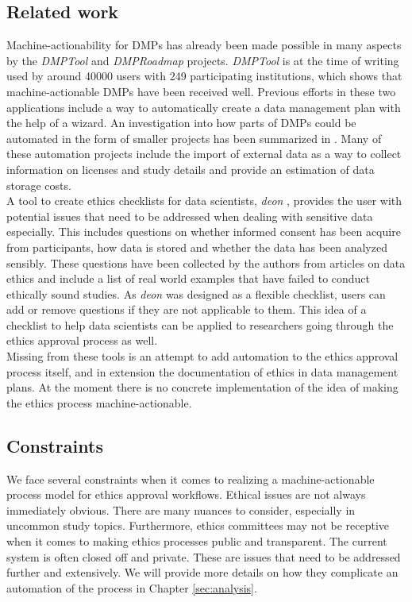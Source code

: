 \documentclass[10pt]{article}
\begin{document}
\subsection{Related work}
Machine-actionability for DMPs has already been made possible in many aspects by the \textit{DMPTool} \cite{dmptool} and \textit{DMPRoadmap} \cite{dmprmap} projects. \textit{DMPTool} is at the time of writing used by around 40000 users with 249 participating institutions, which shows that machine-actionable DMPs have been received well. Previous efforts in these two applications include a way to automatically create a data management plan with the help of a wizard. An investigation into how parts of DMPs could be automated in the form of smaller projects has been summarized in \cite{dmpblog}. Many of these automation projects include the import of external data as a way to collect information on licenses and study details and provide an estimation of data storage costs. \\

A tool to create ethics checklists for data scientists, \textit{deon} \cite{deon}, provides the user with potential issues that need to be addressed when dealing with sensitive data especially. This includes questions on whether informed consent has been acquire from participants, how data is stored and whether the data has been analyzed sensibly. These questions have been collected by the authors from articles on data ethics and include a list of real world examples that have failed to conduct ethically sound studies. As \textit{deon} was designed as a flexible checklist, users can add or remove questions if they are not applicable to them. This idea of a checklist to help data scientists can be applied to researchers going through the ethics approval process as well. \\

Missing from these tools is an attempt to add automation to the ethics approval process itself, and in extension the documentation of ethics in data management plans. At the moment there is no concrete implementation of the idea of making the ethics process machine-actionable.

\subsection{Constraints}
We face several constraints when it comes to realizing a machine-actionable process model for ethics approval workflows. Ethical issues are not always immediately obvious. There are many nuances to consider, especially in uncommon study topics. Furthermore, ethics committees may not be receptive when it comes to making ethics processes public and transparent. The current system is often closed off and private. 
These are issues that need to be addressed further and extensively. We will provide more details on how they complicate an automation of the process in Chapter \ref{sec:analysis}.
\end{document}
